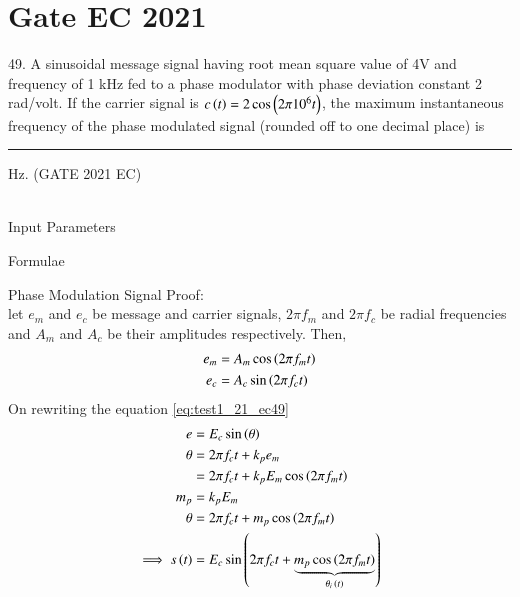 \documentclass[journal,12pt,twocolumn]{IEEEtran}
\begin{document}


\vspace{3cm}

\title{}
\author{EE23BTECH11054 -  Sai Krishna Shanigarapu$^{*}$
}
\maketitle
\newpage
\bigskip

\section*{Gate EC 2021}
49. \hspace{2pt} A sinusoidal message signal having root mean square value of 4V and frequency of 1 kHz fed to a phase modulator with phase deviation constant 2 rad/volt. If the carrier signal is $c\left(t\right) = 2\cos \left(2\pi 10^6 t\right)$, the maximum instantaneous frequency of the phase modulated signal (rounded off to one decimal place) is \rule{1cm}{0.05mm} Hz. \hfill(GATE 2021 EC)\\
\solution\\

\begin{table}[ht]
    \centering
    \begin{adjustbox}{width=\columnwidth}
    
    \end{adjustbox}
    \caption{Input Parameters}
    \label{tab:tab1_gate_2021_ec_49}
\end{table}

\begin{table}[ht]
    \centering
    \begin{adjustbox}{width=\columnwidth}
    
    \end{adjustbox}
    \caption{Formulae}
    \label{tab:tab2_gate_2021_ec_49}
\end{table}

Phase Modulation Signal Proof:\\
let $e_m$ and $e_c$ be message and carrier signals, $2\pi f_m$ and $2\pi f_c$ be radial frequencies and $A_m$ and $A_c$ be their amplitudes respectively. Then,
\begin{align}
	e_m &= A_m\cos \left(2\pi f_m t\right)\\
	e_c &= A_c \sin \left(2\pi f_c t\right) \label{eq:test1_21_ec49}
\end{align}
On rewriting the equation \ref{eq:test1_21_ec49}
\begin{align}
	e &= E_c\sin \left(\theta\right)\\
	\theta &= 2\pi f_c t + k_p e_m\\
	&= 2\pi f_c t + k_pE_m\cos \left(2\pi f_m t\right)\\
	m_p &= k_p E_m\\
	\theta &= 2\pi f_c t + m_p\cos \left(2\pi f_m t\right)\\
	\implies s\left(t\right) &= E_c\sin \left(2\pi f_c t + \underbrace{m_p\cos \left(2\pi f_m t\right)}_\text{$\theta_i \left(t\right)$}\right) \label{eq:test2_21_ec49}
\end{align}
\end{document}
